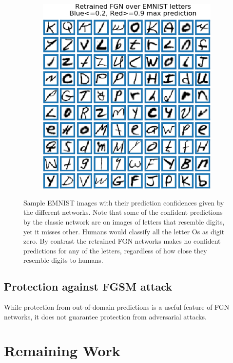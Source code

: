 \documentclass[12pt,oneside]{CUNY_PhD}
\begin{document}
\begin{figure}[!htbp]
\begin{subfigure}[t]{0.32\textwidth}
    \end{subfigure}
    \begin{subfigure}[t]{0.32\textwidth}
        \includegraphics[width=\textwidth]{images/Letters/retrained-letters.png}
    \end{subfigure}
    \caption{Sample EMNIST images with their prediction confidences given by the different networks. Note that some of the confident predictions by the classic network are on images of letters that resemble digits, yet it misses other. Humans would classify all the letter Os as digit zero. By contrast the retrained FGN networks makes no confident predictions for any of the letters, regardless of how close they resemble digits to humans.}
    \label{fig:pred-letters}
\end{figure}

\section{Protection against FGSM attack}
While protection from out-of-domain predictions is a useful feature of FGN networks, it does not guarantee protection from adversarial attacks. 

\chapter{Remaining Work}
\end{document}
